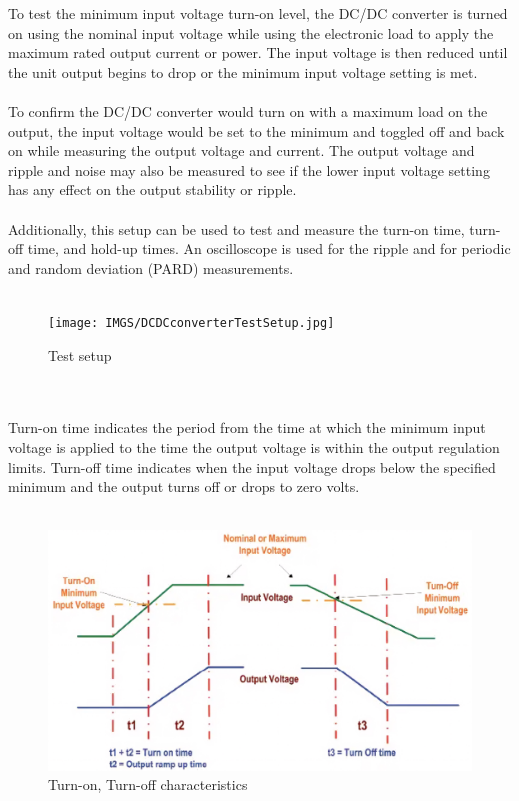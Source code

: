 To test the minimum input voltage turn-on level, the DC/DC converter is turned on using the nominal input voltage while using the electronic load to apply the maximum rated output current or power. The input voltage is then reduced until the unit output begins to drop or the minimum input voltage setting is met.
\\ \\
To confirm the DC/DC converter would turn on with a maximum load on the output, the input voltage would be set to the minimum and toggled off and back on while measuring the output voltage and current. The output voltage and ripple and noise may also be measured to see if the lower input voltage setting has any effect on the output stability or ripple.
\\ \\
Additionally, this setup can be used to test and measure the turn-on time, turn-off time, and hold-up times. An oscilloscope is used for the ripple and for periodic and random deviation (PARD) measurements.
\\ \\
\begin{figure}[h]
	\centering
	\texttt{[image: IMGS/DCDCconverterTestSetup.jpg]}
	\caption{Test setup}
	\label{fig:arch}
\end{figure} 
\\ \\	
Turn-on time indicates the period from the time at which the minimum input voltage is applied to the time the output voltage is within the output regulation limits. Turn-off time indicates when the input voltage drops below the specified minimum and the output turns off or drops to zero volts.
\\ \\
\begin{figure}[h]
	\centering
	\includegraphics[width=\columnwidth]{IMGS/TurnOnTurnOff.jpg}
	\caption{Turn-on, Turn-off characteristics}
	\label{fig:arch}
\end{figure} 

